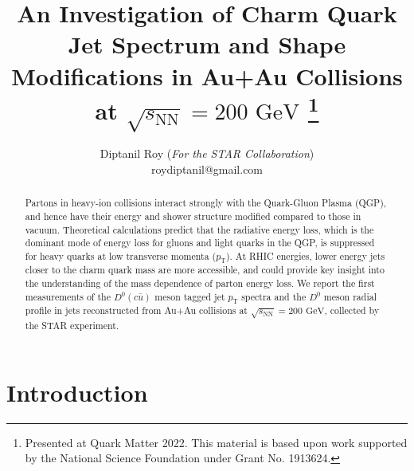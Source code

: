 \documentclass{appolb}
\begin{document}
\title{An Investigation of Charm Quark Jet Spectrum and Shape Modifications in Au+Au Collisions at $\sqrt{s_{\text{NN}}} = 200 \text{ GeV}$%
\thanks{Presented at Quark Matter 2022. This material is based upon work supported by the National Science Foundation under Grant No. 1913624.}%
}
\author{Diptanil Roy (\textit{For the STAR Collaboration}) \\ roydiptanil@gmail.com
\address{Rutgers University}
}
\maketitle
\begin{abstract}
Partons in heavy-ion collisions interact strongly with the Quark-Gluon Plasma (QGP), and hence have their energy and shower structure modified compared to those in vacuum. Theoretical calculations predict that the radiative energy loss, which is the dominant mode of energy loss for gluons and light quarks in the QGP, is suppressed for heavy quarks at low transverse momenta ($p_{\text{T}}$). At RHIC energies, lower energy jets closer to the charm quark mass are more accessible, and could provide key insight into the understanding of the mass dependence of parton energy loss. We report the first measurements of the $D^{0} (c\bar{u})$ meson tagged jet $p_{\text{T}}$ spectra and the $D^{0}$ meson radial profile in jets reconstructed from Au+Au collisions at $\sqrt{s_{\text{NN}}} = 200 \text{ GeV}$, collected by the STAR experiment.

\end{abstract}
  
\section{Introduction}
\end{document}
